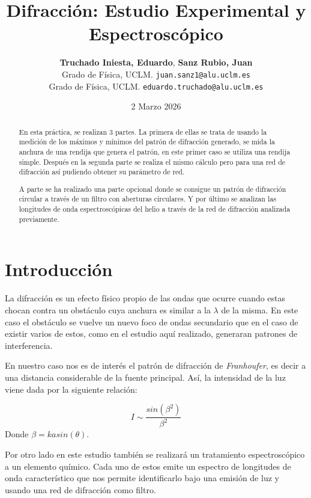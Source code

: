 \documentclass[11pt, a4paper, twocolumn]{article}
\title{\textbf{\Large Difracción: Estudio Experimental y Espectroscópico}}
\author{
    \textbf{Truchado Iniesta, Eduardo}, \textbf{Sanz Rubio, Juan} \\
    \small Grado de Física, UCLM. \texttt{juan.sanz1@alu.uclm.es} \\
    \small Grado de Física, UCLM. \texttt{eduardo.truchado@alu.uclm.es}
}
\date{\small 2 Marzo 2026}
\begin{document}
\maketitle
\thispagestyle{fancy}


\begin{abstract}
En esta práctica, se realizan 3 partes. La primera de ellas se trata de usando la medición de los máximos y mínimos del patrón 
de difracción generado, se mida la anchura de una rendija que genera el patrón, en este primer caso se utiliza una rendija simple. 
Después en la segunda parte se realiza el mismo cálculo pero para una red de difracción así pudiendo obtener su parámetro de red. 

\vspace{0.2cm}

A parte se ha realizado una parte opcional donde se consigue un patrón de difracción circular a través de un filtro con aberturas circulares. Y por último se analizan las 
longitudes de onda espectroscópicas del helio a través de la red de difracción analizada previamente. 
\end{abstract}



\section{Introducción}
La difracción es un efecto físico propio de las ondas que ocurre cuando estas chocan contra un obstáculo cuya anchura
es similar a la $\lambda$ de la misma. En este caso el obstáculo se vuelve un nuevo foco de ondas secundario que en el 
caso de existir varios de estos, como en el estudio aquí realizado, generaran patrones de interferencia. 

\vspace{0.2cm}

En nuestro caso nos es de interés el patrón de difracción de \textit{Franhoufer}, es decir a una distancia considerable de la 
fuente principal. Así, la intensidad de la luz viene dada por la siguiente relación: 

\begin{equation}
    I \sim \frac{sin(\beta^{2})}{\beta^{2}}
\end{equation}
Donde $\beta = k a sin(\theta)$. 

\vspace{0.2cm}

Por otro lado en este estudio también se realizará un tratamiento espectroscópico a un elemento químico. Cada uno de estos 
emite un espectro de longitudes de onda característico que nos permite identificarlo bajo una emisión de luz y usando una red 
de difracción como filtro.
\end{document}
